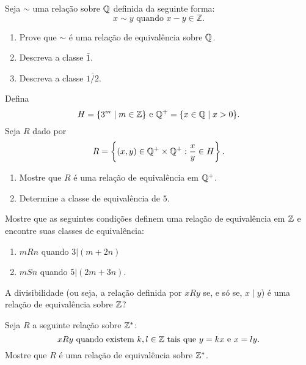 \documentclass[12pt]{exam}
\begin{document}
    \vspace{.3cm}

    \questao{} Seja $\sim$ uma relação sobre $\mathbb{Q}$ definida da seguinte forma:
    \[
        x \sim y \mbox{ quando } x - y \in \mathbb{Z}.
    \]
    \begin{enumerate}[label={\alph*})]
        \item Prove que $\sim$ é uma relação de equivalência sobre $\mathbb{Q}$.

        \item Descreva a classe $\bar{1}$.

        \item Descreva a classe $\overline{1/2}$.
    \end{enumerate}

    \vspace{.3cm}

    \questao{} Defina
    \[
        H = \{3^m \mid m \in \mathbb{Z}\} \mbox{ e } \mathbb{Q}^+ = \{x \in \mathbb{Q} \mid x > 0\}.
    \]
    Seja $R$ dado por
    \[
        R = \left\{(x,y) \in \mathbb{Q}^+\times \mathbb{Q}^+ : \frac{x}{y} \in H\right\}.
    \]
    \begin{enumerate}[label={\alph*})]
        \item Mostre que $R$ é uma relação de equivalência em $\mathbb{Q}^+$.

        \item Determine a classe de equivalência de $5$.
    \end{enumerate}

    \vspace{.3cm}

    \questao{} Mostre que as seguintes condições definem uma relação de equivalência em $\mathbb{Z}$ e encontre suas classes de equivalência:
    \begin{enumerate}[label={\alph*})]
        \item $mRn$ quando $3 | (m + 2n)$

        \item $mSn$ quando $5 | (2m + 3n)$.
    \end{enumerate}

    \vspace{.3cm}

    \questao{} A divisibilidade (ou seja, a relação definida por $xRy$ se, e s{\'o}
    se, $x \mid y$) é uma relação de equivalência sobre $\mathbb{Z}$?

    \vspace{.3cm}

    \questao{} Seja $R$ a seguinte relação sobre $\mathbb{Z}^*$:
    \[
        x R y \mbox{ quando existem }  k, l \in \mathbb{Z} \mbox{ tais que } y = kx \mbox{ e } x = ly.
    \]
    Mostre que $R$ é uma relação de equivalência sobre $\mathbb{Z}^*$.
\end{document}
